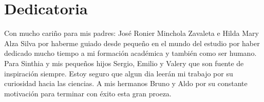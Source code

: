 
\chapter*{Dedicatoria}
	\lipsum[2] \lipsum[3] \lipsum[4] \lipsum[7]
	
	Con mucho cariño para mis padres:
	José Ronier Minchola Zavaleta e
	Hilda Mary Alza Silva 
	por haberme guiado desde pequeño en el 			mundo del estudio por haber dedicado mucho tiempo a mi formación académica y también como ser humano.
	Para Sinthia y mis pequeños hijos Sergio, Emilio y Valery que son fuente de inspiración siempre. Estoy seguro que algun dia leerán mi trabajo por su curiosidad hacia las ciencias.
	A mis hermanos Bruno y Aldo por su constante motivación para terminar con éxito esta gran proeza.
	
	
